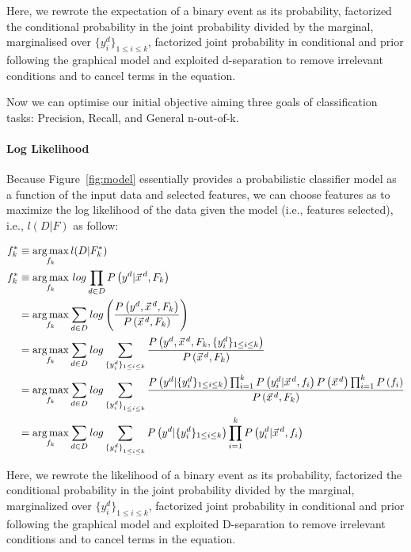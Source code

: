 Here, we rewrote the expectation of a binary event as its probability, factorized the conditional probability in the joint probability divided by the marginal, marginalised over $\{y^d_i\}_{1\leq i\leq k}$, factorized joint probability in conditional and prior following the graphical model and exploited d-separation to remove irrelevant conditions and to cancel terms in the equation.

Now we can optimise our initial objective aiming three goals of classification tasks: Precision, Recall, and General n-out-of-k.
\ENDCOMMENT

\paragraph{Log Likelihood}

Because Figure~\ref{fig:model} essentially provides a probabilistic classifier model as a function
of the input data and selected features, we can choose features as to maximize the log likelihood
of the data given the model (i.e., features selected), i.e., $l(D|F)$ as follow:

\begin{align}
f_k^*&\equiv\argmax_{f_k} l(D|F^*_k) \nonumber\\
f_k^*&\equiv\argmax_{f_k}\,log\prod_{d\in D}P\left(y^d|\vec{x}^{\,d},F_k\right)\nonumber\\
&=\argmax_{f_k}\sum_{d\in D}log\left(\frac{P\left(y^d,\vec{x}^{\,d},F_k\right)}{P\left(\vec{x}^{\,d},F_k\right)}\right)\nonumber\\
&=\argmax_{f_k}\sum_{d\in D}log\sum_{\{y_i^d\}_{1\leq i\leq k}}\frac{P\left(y^d,\vec{x}^{\,d}, F_k,\{y_i^d\}_{1\leq i\leq k}\right)}{P\left(\vec{x}^{\,d},F_k\right)}\nonumber\\
&=\argmax_{f_k} \sum_{d \in D} log\sum_{{\{y_i^d\}}_{1\leq i \leq k}} \frac{P\left(y^d| \{y^d_i\}_{1 \leq i \leq k}\right) \prod_{i=1}^kP\left(y_i^d|\vec{x}^{\,d},f_i\right)P\left(\vec{x}^{\,d}\right)\prod_{i=1}^kP\left(f_i\right)}{P\left(\vec{x}^{\,d}, F_k\right)}\nonumber\\
&=\argmax_{f_k}\sum_{d\in D}log\sum_{{\{y_i^d\}}_{1\leq i\leq k}}P\left(y^d|\{y^d_i\}_{1\leq i\leq k}\right)\prod_{i=1}^kP\left(y_i^d|\vec{x}^{\,d},f_i\right)\nonumber
\end{align}

Here, we rewrote the likelihood of a binary event as its probability,
factorized the conditional probability in the joint probability
divided by the marginal, marginalized over $\{y^d_i\}_{1\leq i\leq
  k}$, factorized joint probability in conditional and prior following
the graphical model and exploited D-separation to remove irrelevant
conditions and to cancel terms in the equation.

